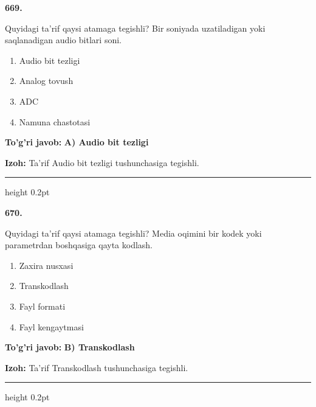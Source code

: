 \documentclass[10pt,a4paper,oneside]{article}
\begin{document}
\noindent\textbf{\color{ink}669.}
\par
Quyidagi ta'rif qaysi atamaga tegishli? Bir soniyada uzatiladigan yoki saqlanadigan audio bitlari soni.
\begin{enumerate}[label=\Alph*),leftmargin=9mm]
\item Audio bit tezligi
\item Analog tovush
\item ADC
\item Namuna chastotasi
\end{enumerate}
\begin{tcolorbox}[enhanced,breakable,colback=teal!4,colframe=teal!50!black,boxrule=0.5pt,arc=1.1mm,left=3mm,right=3mm,top=1.7mm,bottom=1.7mm,before skip=2mm,after skip=2mm]
\textbf{\color{teal}To'g'ri javob:} \textbf{A) Audio bit tezligi}
\par\smallskip
\textbf{Izoh:} Ta'rif Audio bit tezligi tushunchasiga tegishli.
\end{tcolorbox}
\vspace{2mm}\hrule height 0.2pt \vspace{3mm}

\noindent\textbf{\color{ink}670.}
\par
Quyidagi ta'rif qaysi atamaga tegishli? Media oqimini bir kodek yoki parametrdan boshqasiga qayta kodlash.
\begin{enumerate}[label=\Alph*),leftmargin=9mm]
\item Zaxira nusxasi
\item Transkodlash
\item Fayl formati
\item Fayl kengaytmasi
\end{enumerate}
\begin{tcolorbox}[enhanced,breakable,colback=teal!4,colframe=teal!50!black,boxrule=0.5pt,arc=1.1mm,left=3mm,right=3mm,top=1.7mm,bottom=1.7mm,before skip=2mm,after skip=2mm]
\textbf{\color{teal}To'g'ri javob:} \textbf{B) Transkodlash}
\par\smallskip
\textbf{Izoh:} Ta'rif Transkodlash tushunchasiga tegishli.
\end{tcolorbox}
\vspace{2mm}\hrule height 0.2pt \vspace{3mm}
\end{document}
